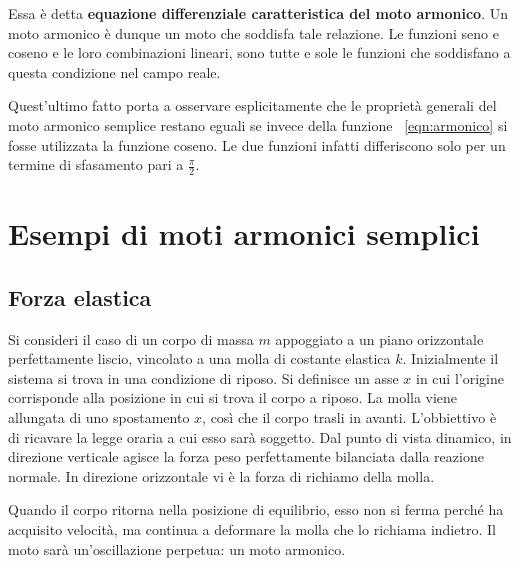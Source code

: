 \begin{figure}[ht]
\end{figure}

Essa è detta \textbf{equazione differenziale caratteristica del moto armonico}. Un moto armonico è dunque un moto che soddisfa tale relazione. Le funzioni seno e coseno e le loro combinazioni lineari, sono tutte e sole le funzioni che soddisfano a questa condizione nel campo reale.

Quest'ultimo fatto porta a osservare esplicitamente che le proprietà generali del moto armonico semplice restano eguali se invece della funzione ~\eqref{eqn:armonico} si fosse utilizzata la funzione coseno. Le due funzioni infatti differiscono solo per un termine di sfasamento pari a $\frac{\pi}{2}$.

\section{Esempi di moti armonici semplici}

\subsection{Forza elastica}

Si consideri il caso di un corpo di massa $m$ appoggiato a un piano orizzontale perfettamente liscio, vincolato a una molla di costante elastica $k$. Inizialmente il sistema si trova in una condizione di riposo. Si definisce un asse $x$ in cui l'origine corrisponde alla posizione in cui si trova il corpo a riposo. La molla viene allungata di uno spostamento $x$, così che il corpo trasli in avanti. L'obbiettivo è di ricavare la legge oraria a cui esso sarà soggetto. Dal punto di vista dinamico, in direzione verticale agisce la forza peso perfettamente bilanciata dalla reazione normale. In direzione orizzontale vi è la forza di richiamo della molla.

Quando il corpo ritorna nella posizione di equilibrio, esso non si ferma perché ha acquisito velocità, ma continua a deformare la molla che lo richiama indietro. Il moto sarà un'oscillazione perpetua: un moto armonico.

